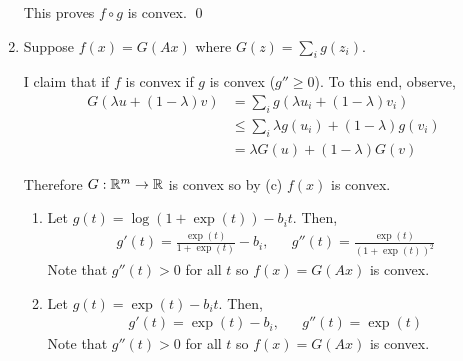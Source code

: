 \documentclass[10pt]{article}
\begin{document}
\begin{solution}[Solution]
\begin{enumerate}[label=(\alph*)]
        This proves \( f\circ g \) is convex. \qed

    \item 
        Suppose \( f(x) = G(Ax) \) where \( G(z) = \sum_i g(z_i) \).

        I claim that if \( f \) is convex if \( g \) is convex (\( g'' \geq 0 \)).
        To this end, observe,
        \begin{align*}
            G( \lambda u + (1-\lambda) v) 
            &= \sum_{i}^{} g( \lambda u_i + (1-\lambda) v_i)
            \\&\leq \sum_{i}^{} \lambda g(u_i) + (1-\lambda) g(v_i)
            \\&= \lambda G(u) + (1-\lambda) G(v)
        \end{align*}

        Therefore \( G:\mathbb{R}^m \to \mathbb{R} \) is convex so by (c) \( f(x) \) is convex.
        

        \begin{enumerate}[label=(\roman*)]
            \item Let \( g(t) = \log(1+\exp(t)) - b_it \). Then,
                \begin{align*}
                    g'(t) = \frac{\exp(t)}{1+\exp(t)} - b_i
                    ,&&
                    g''(t) = \frac{\exp(t)}{(1+\exp(t))^2}
                \end{align*}
                Note that \( g''(t) > 0 \) for all \( t \) so \( f(x) = G(Ax) \) is convex.
            \item Let \( g(t) = \exp(t) - b_it \). Then,
                \begin{align*}
                    g'(t) = \exp(t) - b_i
                    ,&&
                    g''(t) = \exp(t)
                \end{align*}
                Note that \( g''(t) > 0 \) for all \( t \) so \( f(x) = G(Ax) \) is convex.%
        \end{enumerate}
        



\end{enumerate}
\end{solution}
\end{document}
